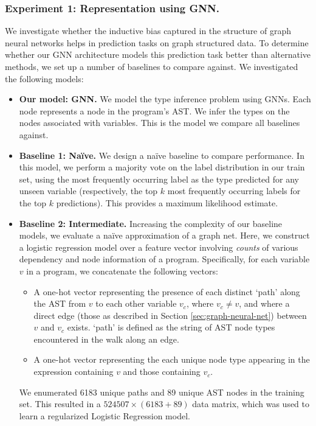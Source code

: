 \subsubsection{Experiment 1: Representation using GNN.}
We investigate whether the inductive bias captured in the structure of graph neural networks helps in prediction tasks on graph structured data.
To determine whether our GNN architecture models this prediction task better than alternative methods, we set up a number of baselines to compare against.
We investigated the following models:
\begin{itemize}[noitemsep,topsep=0pt]
\item \textbf{Our model: GNN.}
  We model the type inference problem using GNNs.
  Each node represents a node in the program's AST.
  We infer the types on the nodes associated with variables.
  This is the model we compare all baselines against.
\item \textbf{Baseline 1: Na\"ive.}
  We design a na\"ive baseline to compare performance.
  In this model, we perform a majority vote on the label distribution in our train set, using the most frequently occurring label as the type predicted for any unseen variable (respectively, the top $k$ most frequently occurring labels for the top $k$ predictions).
  This provides a maximum likelihood estimate.
\item \textbf{Baseline 2: Intermediate.}
  Increasing the complexity of our baseline models, we evaluate a na\"ive approximation of a graph net.
  Here, we construct a logistic regression model over a feature vector involving \textit{counts} of various dependency and node information of a program.
  Specifically, for each variable $v$ in a program, we concatenate the following vectors:
  \begin{itemize}[noitemsep,topsep=0pt]
  \item A one-hot vector representing the presence of each distinct `path' along the AST from $v$ to each other variable $v_c$, where $v_c \neq v$, and where a direct edge (those as described in Section \ref{sec:graph-neural-net}) between $v$ and $v_c$ exists. `path' is defined as the string of AST node types encountered in the walk along an edge.
  \item A one-hot vector representing the each unique node type appearing in the expression containing $v$ and those containing $v_c$.
  \end{itemize}
  We enumerated 6183 unique paths and 89 unique AST nodes in the training set.
  This resulted in a $524507 \times (6183+89)$ data matrix, which was used to learn a regularized Logistic Regression model.

\end{itemize}
